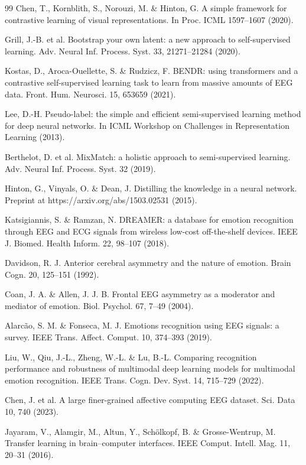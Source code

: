 \begin{thebibliography}{99}
 Chen, T., Kornblith, S., Norouzi, M. \& Hinton, G. A simple framework for contrastive learning of visual representations. In Proc. ICML 1597–1607 (2020).

 Grill, J.-B. et al. Bootstrap your own latent: a new approach to self-supervised learning. Adv. Neural Inf. Process. Syst. 33, 21271–21284 (2020).

 Kostas, D., Aroca-Ouellette, S. \& Rudzicz, F. BENDR: using transformers and a contrastive self-supervised learning task to learn from massive amounts of EEG data. Front. Hum. Neurosci. 15, 653659 (2021).

 Lee, D.-H. Pseudo-label: the simple and efficient semi-supervised learning method for deep neural networks. In ICML Workshop on Challenges in Representation Learning (2013).

 Berthelot, D. et al. MixMatch: a holistic approach to semi-supervised learning. Adv. Neural Inf. Process. Syst. 32 (2019).

 Hinton, G., Vinyals, O. \& Dean, J. Distilling the knowledge in a neural network. Preprint at https://arxiv.org/abs/1503.02531 (2015).

 Katsigiannis, S. \& Ramzan, N. DREAMER: a database for emotion recognition through EEG and ECG signals from wireless low-cost off-the-shelf devices. IEEE J. Biomed. Health Inform. 22, 98–107 (2018).

 Davidson, R. J. Anterior cerebral asymmetry and the nature of emotion. Brain Cogn. 20, 125–151 (1992).

 Coan, J. A. \& Allen, J. J. B. Frontal EEG asymmetry as a moderator and mediator of emotion. Biol. Psychol. 67, 7–49 (2004).

 Alarcão, S. M. \& Fonseca, M. J. Emotions recognition using EEG signals: a survey. IEEE Trans. Affect. Comput. 10, 374–393 (2019).

 Liu, W., Qiu, J.-L., Zheng, W.-L. \& Lu, B.-L. Comparing recognition performance and robustness of multimodal deep learning models for multimodal emotion recognition. IEEE Trans. Cogn. Dev. Syst. 14, 715–729 (2022).

 Chen, J. et al. A large finer-grained affective computing EEG dataset. Sci. Data 10, 740 (2023).

 Jayaram, V., Alamgir, M., Altun, Y., Schölkopf, B. \& Grosse-Wentrup, M. Transfer learning in brain–computer interfaces. IEEE Comput. Intell. Mag. 11, 20–31 (2016).


\end{thebibliography}
